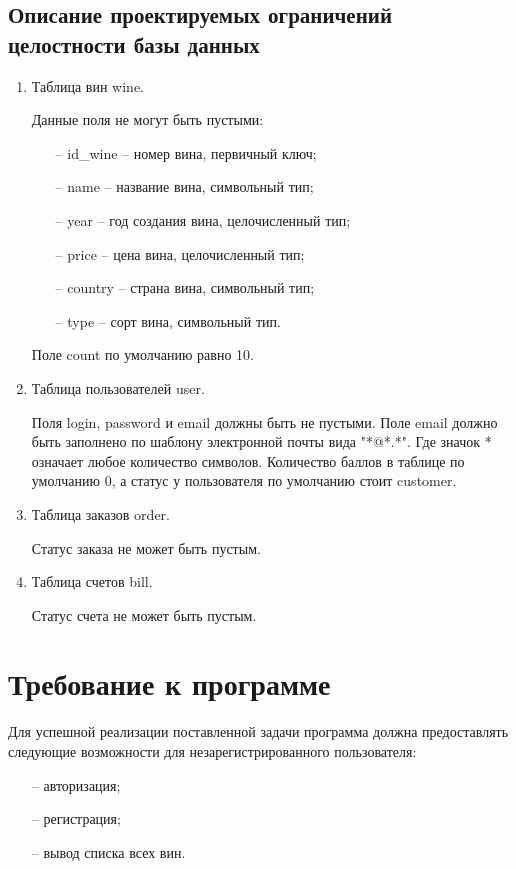 \subsection{Описание проектируемых ограничений целостности базы данных}
\begin{enumerate}[label=\arabic*)]
	\item Таблица вин wine.

     Данные поля не могут быть пустыми:
     \begin{itemize}
         \item[--] id\_wine -- номер вина, первичный ключ;
         \item[--] name -- название вина, символьный тип;
         \item[--] year -- год создания вина, целочисленный тип;
         \item[--] price -- цена вина, целочисленный тип;
         \item[--] country -- страна вина, символьный тип;
         \item[--] type -- сорт вина, символьный тип.
     \end{itemize}

     Поле count по умолчанию равно 10.
 
	\item Таблица пользователей user.

Поля login, password и email должны быть не пустыми. Поле email должно быть заполнено по шаблону электронной почты вида "*@*.*"{}. Где значок * означает любое количество символов. Количество баллов в таблице по умолчанию 0, а статус у пользователя по умолчанию стоит customer.

	\item Таблица заказов order.

Статус заказа не может быть пустым.

        
        \item Таблица счетов bill.
        
        Статус счета не может быть пустым.

\end{enumerate}
\section{Требование к программе}

Для успешной реализации поставленной задачи программа должна
предоставлять следующие возможности для незарегистрированного пользователя:
\begin{itemize}
    \item[--] авторизация;
    \item[--] регистрация;
    \item[--] вывод списка всех вин.
\end{itemize}


